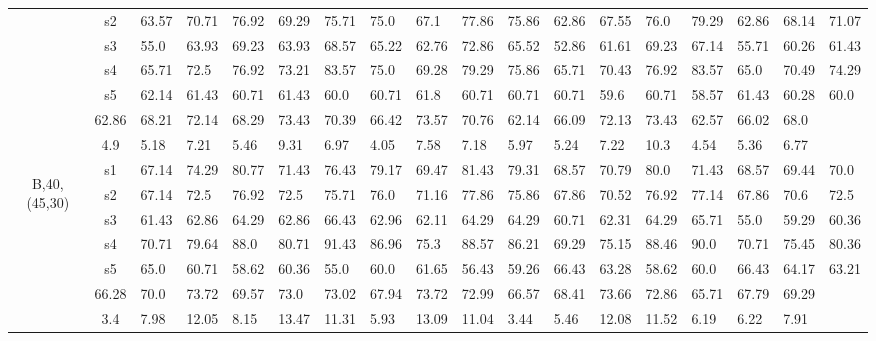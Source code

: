\begin{table}[h]
{\begin{tabular}{cc|llll|llll|llll|llll}
 & s2 & 63.57 & 70.71 & 76.92 & 69.29 & 75.71 & 75.0 & 67.1 & 77.86 & 75.86 & 62.86 & 67.55 & 76.0 & 79.29 & 62.86 & 68.14 & 71.07 \\
 & s3 & 55.0 & 63.93 & 69.23 & 63.93 & 68.57 & 65.22 & 62.76 & 72.86 & 65.52 & 52.86 & 61.61 & 69.23 & 67.14 & 55.71 & 60.26 & 61.43 \\
 & s4 & 65.71 & 72.5 & 76.92 & 73.21 & 83.57 & 75.0 & 69.28 & 79.29 & 75.86 & 65.71 & 70.43 & 76.92 & 83.57 & 65.0 & 70.49 & 74.29 \\
 & s5 & 62.14 & 61.43 & 60.71 & 61.43 & 60.0 & 60.71 & 61.8 & 60.71 & 60.71 & 60.71 & 59.6 & 60.71 & 58.57 & 61.43 & 60.28 & 60.0 \\
\rowcolor{lightgray!50}\multicolumn{2}{r|}{avg} & 62.86 & 68.21 & 72.14 & 68.29 & 73.43 & 70.39 & 66.42 & 73.57 & 70.76 & 62.14 & 66.09 & 72.13 & 73.43 & 62.57 & 66.02 & 68.0 \\
\rowcolor{lightgray!50}\multicolumn{2}{r|}{std} & 4.9 & 5.18 & 7.21 & 5.46 & 9.31 & 6.97 & 4.05 & 7.58 & 7.18 & 5.97 & 5.24 & 7.22 & 10.3 & 4.54 & 5.36 & 6.77 \\
\multirow{6}{*}{\begin{sideways}B,40,(45,30)\end{sideways}} & s1 & 67.14 & 74.29 & 80.77 & 71.43 & 76.43 & 79.17 & 69.47 & 81.43 & 79.31 & 68.57 & 70.79 & 80.0 & 71.43 & 68.57 & 69.44 & 70.0 \\
 & s2 & 67.14 & 72.5 & 76.92 & 72.5 & 75.71 & 76.0 & 71.16 & 77.86 & 75.86 & 67.86 & 70.52 & 76.92 & 77.14 & 67.86 & 70.6 & 72.5 \\
 & s3 & 61.43 & 62.86 & 64.29 & 62.86 & 66.43 & 62.96 & 62.11 & 64.29 & 64.29 & 60.71 & 62.31 & 64.29 & 65.71 & 55.0 & 59.29 & 60.36 \\
 & s4 & 70.71 & 79.64 & 88.0 & 80.71 & 91.43 & 86.96 & 75.3 & 88.57 & 86.21 & 69.29 & 75.15 & 88.46 & 90.0 & 70.71 & 75.45 & 80.36 \\
 & s5 & 65.0 & 60.71 & 58.62 & 60.36 & 55.0 & 60.0 & 61.65 & 56.43 & 59.26 & 66.43 & 63.28 & 58.62 & 60.0 & 66.43 & 64.17 & 63.21 \\
\rowcolor{lightgray!50}\multicolumn{2}{r|}{avg} & 66.28 & 70.0 & 73.72 & 69.57 & 73.0 & 73.02 & 67.94 & 73.72 & 72.99 & 66.57 & 68.41 & 73.66 & 72.86 & 65.71 & 67.79 & 69.29 \\
\rowcolor{lightgray!50}\multicolumn{2}{r|}{std} & 3.4 & 7.98 & 12.05 & 8.15 & 13.47 & 11.31 & 5.93 & 13.09 & 11.04 & 3.44 & 5.46 & 12.08 & 11.52 & 6.19 & 6.22 & 7.91
\end{tabular}}
\end{table}

